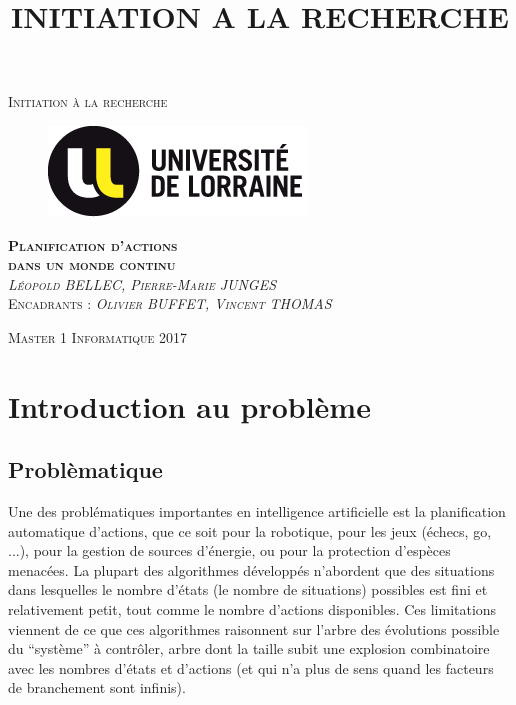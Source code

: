 \documentclass[pdftex,french, english]{article}	%
\begin{document}

\title{INITIATION A LA RECHERCHE}

\begin{titlepage}
\begin{center}

\textsc{\Large Initiation à la recherche}\\[4em]

\begin{figure}[h]
\begin{center}
\includegraphics{lorraine.png}
\end{center}
\end{figure}

\vspace{4em}
\textsc{\Large \textbf{Planification d'actions \\ dans un monde continu}}\\[3em]
\vspace{4em}
\textsc{\textit{Léopold BELLEC, Pierre-Marie JUNGES}}\\[1em]
\vspace{1em}
\textsc{Encadrants : \textit{Olivier BUFFET, Vincent THOMAS}}\\[1em]


\end{center}

\vspace*{\fill}
\textsc{Master 1 Informatique \hspace*{\fill} 2017}

\end{titlepage}

\newpage
{}

\tableofcontents


\newpage
{}
\section{Introduction au problème}
	\subsection{Problèmatique}
	Une des problématiques importantes en intelligence artificielle est la planification automatique d’actions, que ce soit pour la robotique, pour les jeux (échecs, go, ...), pour la gestion de sources d’énergie, ou pour la protection d’espèces menacées. La plupart des algorithmes développés n’abordent que des situations dans lesquelles le nombre d’états (le nombre de situations) possibles est fini et relativement petit, tout comme le nombre d’actions disponibles. Ces limitations viennent de ce que ces algorithmes raisonnent sur l’arbre des évolutions possible du “système” à contrôler, arbre dont la taille subit une explosion combinatoire avec les nombres d’états et d’actions (et qui n’a plus de sens quand les facteurs de branchement sont infinis).
\end{document}
